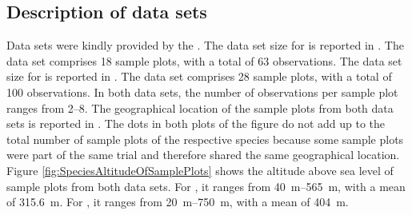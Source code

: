 \subsection{Description of data sets}

Data sets were kindly provided by the \NWFVA{}. The data set size for \Beech{} is reported in .  The data set comprises 18 sample plots, with a total of 63 observations.  The data set size for \Spruce{} is reported in .  The data set comprises 28 sample plots, with a total of 100 observations.  In both data sets, the number of observations per sample plot ranges from \numrange{2}{8}.  The geographical location of the sample plots from both data sets is reported in .  The dots in both plots of the figure do not add up to the total number of sample plots of the respective species because some sample plots were part of the same trial and therefore shared the same geographical location.
Figure \ref{fig:SpeciesAltitudeOfSamplePlots} shows the altitude above sea level of sample plots from both data sets.  For \Beech{}, it ranges from \SIrange{40}{565}{\meter}, with a mean of \SI{315.6}{\meter}.  For \Spruce{}, it ranges from \SIrange{20}{750}{\meter}, with a mean of \SI{404}{\meter}.


